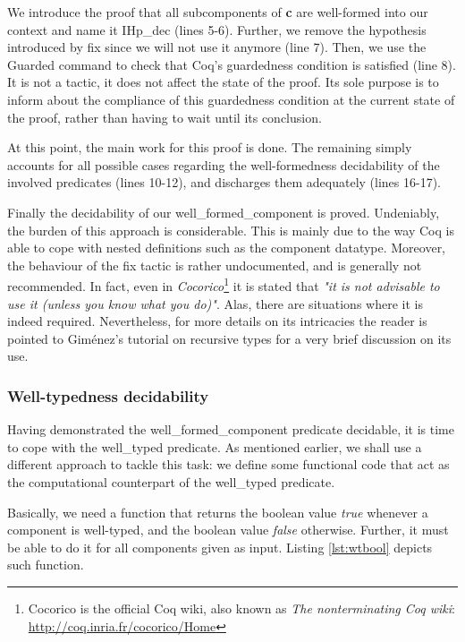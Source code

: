 		We introduce the proof that all sub\textsf{component}s of \textbf{c} are
	well-formed into our context and name it \textsf{IHp\_dec} (lines 5-6). Further, we
	remove the hypothesis introduced by \textsf{fix} since we will not use it anymore (line 7).
	Then, we use the \textsf{Guarded} command to check that Coq's guardedness 
	condition is satisfied (line 8). It is not a tactic, it does not affect the state of the
	proof. Its sole purpose is to inform about the compliance of this guardedness condition
	at the current state of the proof, rather than having to wait until its conclusion.

		At this point, the main work for this proof is done. The remaining simply
	accounts for all possible cases regarding the well-formedness decidability of 
	the involved predicates (lines 10-12), and discharges them adequately (lines 16-17).
	

		Finally the decidability of our \textsf{well\_formed\_component} is proved. Undeniably, 
	the burden of this approach is considerable. This is mainly due to the way Coq is able to cope
	with nested definitions such as the \textsf{component} datatype. Moreover, the behaviour 
	of the \textsf{fix} tactic is rather undocumented, and is generally not recommended. In fact, even in
	\textit{Cocorico}\footnote{Cocorico is the official Coq wiki, also known as \textit{The nonterminating Coq wiki}: \url{http://coq.inria.fr/cocorico/Home}} it is stated that \textit{"it is not advisable to use it (unless you know what you do)"}.
	Alas, there are situations where it is indeed required. Nevertheless, for more details on its intricacies the reader is pointed to 
	Gim\'enez's tutorial on recursive types \cite{Giménez98atutorial} for a very brief discussion on its use. 
	
	
	
\subsubsection{Well-typedness decidability}


	Having demonstrated the \textsf{well\_formed\_component} predicate decidable, it is time to cope
	with the \textsf{well\_typed} predicate. As mentioned earlier, we shall use a different approach
	to tackle this task: we define some functional code that act as the computational counterpart of the \textsf{well\_typed}
	predicate.
		
			Basically, we need a function that returns the boolean value \textit{true} whenever
		a \textsf{component} is well-typed, and the boolean value \textit{false} otherwise. Further, it must be able
		to do it for all \textsf{component}s given as input. Listing \ref{lst:wtbool} depicts such function.

